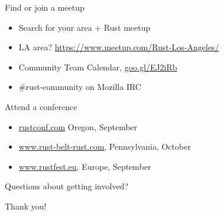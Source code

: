 \documentclass[aspectratio=169]{beamer}
\begin{document}
\begin{frame}
    Find or join a meetup
    \begin{itemize}
        \item Search for your area + Rust meetup
        \item LA area? \url{https://www.meetup.com/Rust-Los-Angeles/}
        \item Community Team Calendar, \url{goo.gl/EJ2iRb}
        \item \#rust-community on Mozilla IRC
    \end{itemize}
\end{frame}

\begin{frame}
    Attend a conference
    \begin{itemize}
        \item \url{rustconf.com} Oregon, September
        \item \url{www.rust-belt-rust.com}, Pennsylvania, October
        \item \url{www.rustfest.eu}, Europe, September
    \end{itemize}
\end{frame}

\begin{frame}
    \hfill Questions about getting involved?
\end{frame}

\begin{frame}

Thank you!

\end{frame}
%
%
\end{document}
